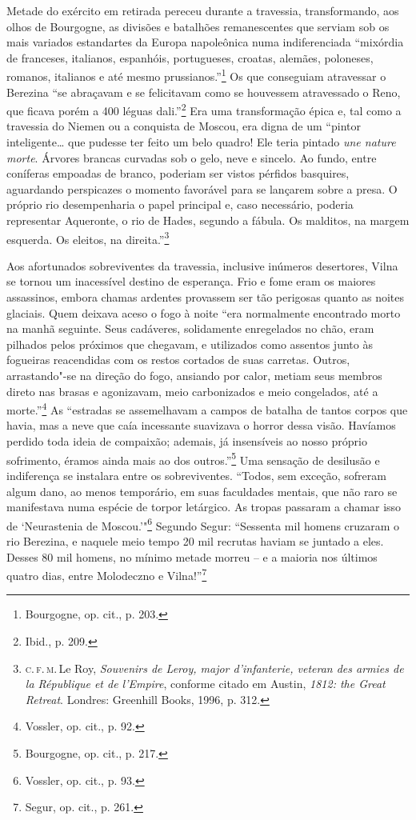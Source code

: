 Metade do exército em retirada pereceu durante a travessia,
transformando, aos olhos de Bourgogne, as divisões e batalhões
remanescentes que serviam sob os mais variados estandartes da Europa
napoleônica numa indiferenciada ``mixórdia de franceses, italianos,
espanhóis, portugueses, croatas, alemães, poloneses, romanos, italianos
e até mesmo prussianos.''\footnote{Bourgogne, op. cit., p. 203.} Os que
conseguiam atravessar o Berezina ``se abraçavam e se felicitavam como se
houvessem atravessado o Reno, que ficava porém a 400 léguas
dali.''\footnote{Ibid., p. 209.} Era uma transformação épica e, tal como
a travessia do Niemen ou a conquista de Moscou, era digna de um ``pintor
inteligente\ldots{} que pudesse ter feito um belo quadro! Ele teria
pintado \textit{une nature morte}. Árvores brancas curvadas sob o gelo,
neve e sincelo. Ao fundo, entre coníferas empoadas de branco, poderiam
ser vistos pérfidos basquires, aguardando perspicazes o momento
favorável para se lançarem sobre a presa. O próprio rio desempenharia o
papel principal e, caso necessário, poderia representar Aqueronte, o rio
de Hades, segundo a fábula. Os malditos, na margem esquerda. Os eleitos,
na direita.''\footnote{\textsc{c.\,f.\,m.}\,Le Roy, \textit{Souvenirs de Leroy, major d'infanterie, veteran des armies de la République et de l'Empire}, conforme citado em Austin, \textit{1812: the Great Retreat}. Londres: Greenhill Books, 1996, p. 312.}

Aos afortunados sobreviventes da travessia, inclusive inúmeros
desertores, Vilna se tornou um inacessível destino de esperança. Frio e
fome eram os maiores assassinos, embora chamas ardentes provassem ser
tão perigosas quanto as noites glaciais. Quem deixava aceso o fogo à
noite ``era normalmente encontrado morto na manhã seguinte. Seus
cadáveres, solidamente enregelados no chão, eram pilhados pelos próximos
que chegavam, e utilizados como assentos junto às fogueiras reacendidas
com os restos cortados de suas carretas. Outros, arrastando"-se na
direção do fogo, ansiando por calor, metiam seus membros direto nas
brasas e agonizavam, meio carbonizados e meio congelados, até a
morte.''\footnote{Vossler, op. cit., p. 92.} As ``estradas se
assemelhavam a campos de batalha de tantos corpos que havia, mas a neve
que caía incessante suavizava o horror dessa visão. Havíamos perdido
toda ideia de compaixão; ademais, já insensíveis ao nosso próprio
sofrimento, éramos ainda mais ao dos outros.''\footnote{Bourgogne, op.
  cit., p. 217.} Uma sensação de desilusão e indiferença se instalara
entre os sobreviventes. ``Todos, sem exceção, sofreram algum dano, ao
menos temporário, em suas faculdades mentais, que não raro se
manifestava numa espécie de torpor letárgico. As tropas passaram a
chamar isso de `Neurastenia de Moscou.'"\footnote{Vossler, op. cit., p. 93.} Segundo Segur: ``Sessenta mil homens cruzaram o rio Berezina, e naquele meio tempo 20 mil recrutas haviam se juntado a
eles. Desses 80 mil homens, no mínimo metade morreu -- e a maioria
nos últimos quatro dias, entre Molodeczno e Vilna!''\footnote{Segur, op. cit., p. 261.}

